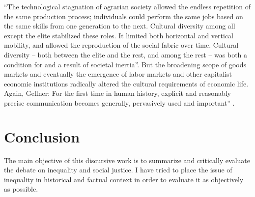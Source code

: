 \documentclass[12pt]{article}
\newcommand{\1}{\mathbbm 1}
\begin{document}
		
		``The technological stagnation of agrarian society allowed the
		endless repetition of the same production process; individuals
		could perform the same jobs based on the same skills from one
		generation to the next. Cultural diversity among all except the
		elite stabilized these roles. It limited both horizontal and vertical
		mobility, and allowed the reproduction of the social
		fabric over time. Cultural diversity – both between the elite
		and the rest, and among the rest – was both a condition for and
		a result of societal inertia''. But the broadening scope of goods markets and eventually
		the emergence of labor markets and other capitalist economic
		institutions radically altered the cultural requirements of
		economic life. Again, Gellner:
		For the first time in human history, explicit and reasonably precise
		communication becomes generally, pervasively used and
		important'' \cite{bowles2012new}.
			

		
		
		
		
		
		
		\section{Conclusion}
		
		
		The main objective of this discursive work is to summarize and critically evaluate the debate on inequality and social justice. I have tried to place the issue of inequality in historical and factual context in order to evaluate it as objectively as possible.
		
\end{document}
